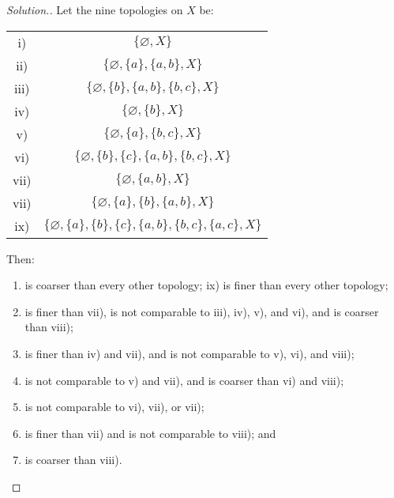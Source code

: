 \documentclass{article}
\begin{document}
\begin{proof}[Solution.]
    Let the nine topologies on $X$ be:

    \begin{center}
        \begin{tabular}{ c c }
            i) & $\{ \varnothing, X \}$ \\
            ii) & $\{ \varnothing, \{ a \}, \{ a, b \}, X \}$ \\
            iii) & $\{ \varnothing, \{ b \}, \{ a, b \}, \{ b, c \}, X \}$ \\
            iv) & $\{ \varnothing, \{ b \}, X \}$ \\
            v) & $\{ \varnothing, \{ a \}, \{ b, c \}, X \}$ \\
            vi) & $\{ \varnothing, \{ b \}, \{ c \}, \{ a, b \}, \{ b, c \}, X \}$ \\
            vii) & $\{ \varnothing, \{ a, b \}, X \}$ \\
            vii) & $\{ \varnothing, \{ a \}, \{ b \}, \{ a, b \}, X \}$ \\
            ix) & $\{ \varnothing, \{ a \}, \{ b \}, \{ c \}, \{ a, b \}, \{ b, c \}, \{ a, c \}, X \}$ \\
        \end{tabular}
    \end{center}
    Then:
    \begin{enumerate}[label=\roman{enumi})]
        \item is coarser than every other topology; ix) is finer than every other topology;
        \item is finer than vii), is not comparable to iii), iv), v), and vi), and is coarser than viii);
        \item is finer than iv) and vii), and is not comparable to v), vi), and viii);
        \item is not comparable to v) and vii), and is coarser than vi) and viii);
        \item is not comparable to vi), vii), or vii);
        \item is finer than vii) and is not comparable to viii); and
        \item is coarser than viii).
    \end{enumerate}
\end{proof}
\end{document}
